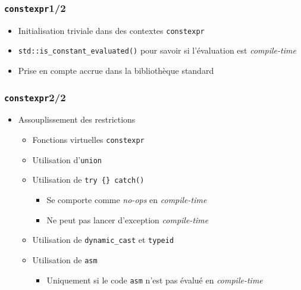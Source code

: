 \documentclass[C++.tex]{subfiles}
\begin{document}
\begin{frame}[fragile]
	\frametitle{\lstinline|constexpr|\titlehfill{}1/2}
	\begin{itemize}
		\item Initialisation triviale dans des contextes \lstinline|constexpr|
		\item \lstinline|std::is_constant_evaluated()| pour savoir si l'évaluation est \textit{compile-time}
		\item Prise en compte accrue dans la bibliothèque standard
		
	\end{itemize}
\end{frame}

\begin{frame}[fragile]
	\frametitle{\lstinline|constexpr|\titlehfill{}2/2}
	\begin{itemize}
		\item Assouplissement des restrictions
		\begin{itemize}
			\item Fonctions virtuelles \lstinline|constexpr|
			\item Utilisation d'\lstinline|union|
			\item Utilisation de \lstinline|try {} catch()|
			\begin{itemize}
				\item Se comporte comme \textit{no-ops} en \textit{compile-time}
				\item Ne peut pas lancer d'exception \textit{compile-time}
			\end{itemize}
			\item Utilisation de \lstinline|dynamic_cast| et \lstinline|typeid|
			\item Utilisation de \lstinline|asm|
			\begin{itemize}
				\item Uniquement si le code \lstinline|asm| n'est pas évalué en \textit{compile-time}


			\end{itemize}
		\end{itemize}
	\end{itemize}
\end{frame}
\end{document}
